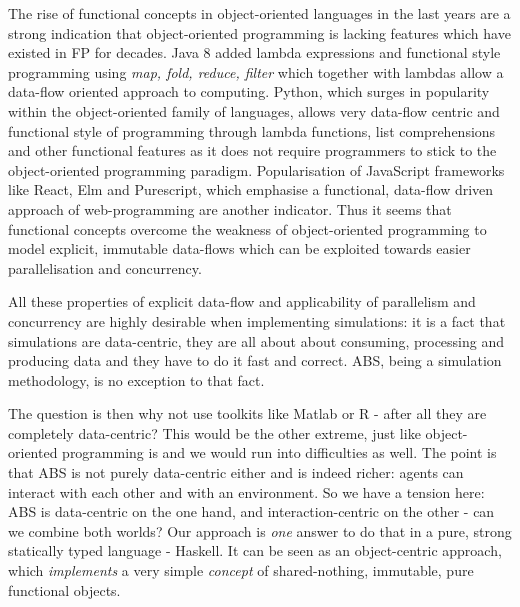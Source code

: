 The rise of functional concepts in object-oriented languages in the last years are a strong indication that object-oriented programming is lacking features which have existed in FP for decades. Java 8 added lambda expressions and functional style programming using \textit{map, fold, reduce, filter} which together with lambdas allow a data-flow oriented approach to computing. Python, which surges in popularity within the object-oriented family of languages, allows very data-flow centric and functional style of programming through lambda functions, list comprehensions and other functional features as it does not require programmers to stick to the object-oriented programming paradigm. Popularisation of JavaScript frameworks like React, Elm and Purescript, which emphasise a functional, data-flow driven approach of web-programming are another indicator. Thus it seems that functional concepts overcome the weakness of object-oriented programming to model explicit, immutable data-flows which can be exploited towards easier parallelisation and concurrency.

All these properties of explicit data-flow and applicability of parallelism and concurrency are highly desirable when implementing simulations: it is a fact that simulations are data-centric, they are all about about consuming, processing and producing data and they have to do it fast and correct. ABS, being a simulation methodology, is no exception to that fact.

The question is then why not use toolkits like Matlab or R - after all they are completely data-centric? This would be the other extreme, just like object-oriented programming is and we would run into difficulties as well. The point is that ABS is not purely data-centric either and is indeed richer: agents can interact with each other and with an environment. So we have a tension here: ABS is data-centric on the one hand, and interaction-centric on the other - can we combine both worlds? Our approach is \textit{one} answer to do that in a pure, strong statically typed language - Haskell. It can be seen as an object-centric approach, which \textit{implements} a very simple \textit{concept} of shared-nothing, immutable, pure functional objects.

